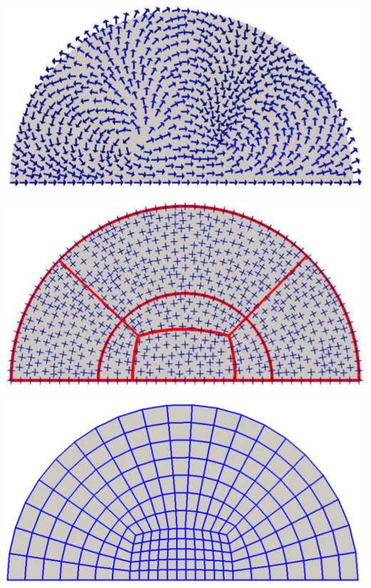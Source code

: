 \documentclass[a0paper,portrait, fontscale=0.33]{baposter}
\begin{document}
\begin{poster}
{\begin{minipage}[b]{0.23\linewidth}
\includegraphics[width=\textwidth]{2}
\label{fig:figure2}
\end{minipage}
\hspace{0.15cm}
\begin{minipage}[b]{0.23\linewidth}

\includegraphics[width=\textwidth]{3}
\label{fig:figure3}
\end{minipage}
\hspace{0.15cm}
\begin{minipage}[b]{0.23\linewidth}

\includegraphics[width=\textwidth]{4}
\label{fig:figure4}
\end{minipage}
\bigskip

}
\end{poster}
\end{document}
